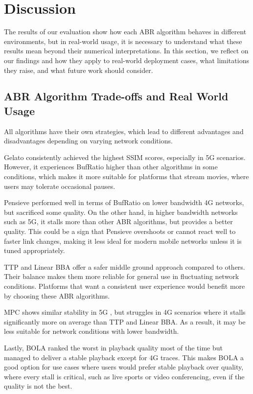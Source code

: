 \section{Discussion}\label{s:discussion}

The results of our evaluation show how each ABR algorithm behaves in different environments, but in real-world usage, it is necessary to understand what these results mean beyond their numerical interpretations. In this section, we reflect on our findings and how they apply to real-world deployment cases, what limitations they raise, and what future work should consider.

\subsection*{ABR Algorithm Trade-offs and Real World Usage}

All algorithms have their own strategies, which lead to different advantages and disadvantages depending on varying network conditions.

Gelato consistently achieved the highest SSIM scores, especially in 5G scenarios. However, it experiences BufRatio higher than other algorithms in some conditions, which makes it more suitable for platforms that stream movies, where users may tolerate occasional pauses.

Pensieve performed well in terms of BufRatio on lower bandwidth 4G networks, but sacrificed some quality. On the other hand, in higher bandwidth networks such as 5G, it stalls more than other ABR algorithms, but provides a better quality. This could be a sign that Pensieve overshoots or cannot react well to faster link changes, making it less ideal for modern mobile networks unless it is tuned appropriately.

TTP and Linear BBA offer a safer middle ground approach compared to others. Their balance makes them more reliable for general use in fluctuating network conditions. Platforms that want a consistent user experience would benefit more by choosing these ABR algorithms. 

MPC shows similar stability in 5G , but struggles in 4G scenarios where it stalls significantly more on average than TTP and Linear BBA. As a result, it may be less suitable for network conditions with lower bandwidth.

Lastly, BOLA ranked the worst in playback quality most of the time but managed to deliver a stable playback except for 4G traces. This makes BOLA a good option for use cases where users would prefer stable playback over quality, where every stall is critical, such as live sports or video conferencing, even if the quality is not the best.

